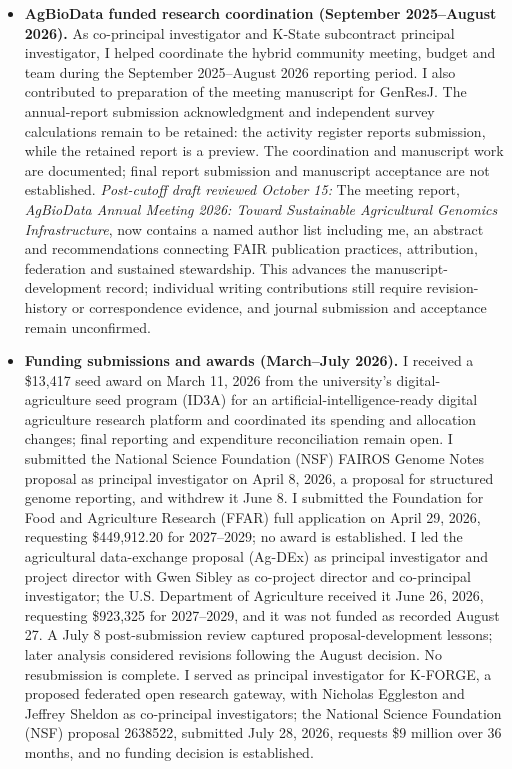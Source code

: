 \begin{itemize}
\item \textbf{AgBioData funded research coordination (September 2025--August 2026).}\label{update-agbiodata} As co-principal investigator and K-State subcontract principal investigator, I helped coordinate the hybrid community meeting, budget and team during the September 2025--August 2026 reporting period. I also contributed to preparation of the meeting manuscript for GenResJ. The annual-report submission acknowledgment and independent survey calculations remain to be retained: the activity register reports submission, while the retained report is a preview. The coordination and manuscript work are documented; final report submission and manuscript acceptance are not established. \textit{Post-cutoff draft reviewed October 15:} The meeting report, \textit{AgBioData Annual Meeting 2026: Toward Sustainable Agricultural Genomics Infrastructure}, now contains a named author list including me, an abstract and recommendations connecting FAIR publication practices, attribution, federation and sustained stewardship. This advances the manuscript-development record; individual writing contributions still require revision-history or correspondence evidence, and journal submission and acceptance remain unconfirmed.
\item \textbf{Funding submissions and awards (March--July 2026).} I received a \$13,417 seed award on March 11, 2026 from the university's digital-agriculture seed program (ID3A) for an artificial-intelligence-ready digital agriculture research platform and coordinated its spending and allocation changes; final reporting and expenditure reconciliation remain open. I submitted the National Science Foundation (NSF) FAIROS Genome Notes proposal as principal investigator on April 8, 2026, a proposal for structured genome reporting, and withdrew it June 8. I submitted the Foundation for Food and Agriculture Research (FFAR) full application on April 29, 2026, requesting \$449,912.20 for 2027--2029; no award is established. I led the agricultural data-exchange proposal (Ag-DEx) as principal investigator and project director with Gwen Sibley as co-project director and co-principal investigator; the U.S. Department of Agriculture received it June 26, 2026, requesting \$923,325 for 2027--2029, and it was not funded as recorded August 27. A July 8 post-submission review captured proposal-development lessons; later analysis considered revisions following the August decision. No resubmission is complete. I served as principal investigator for K-FORGE, a proposed federated open research gateway, with Nicholas Eggleston and Jeffrey Sheldon as co-principal investigators; the National Science Foundation (NSF) proposal 2638522, submitted July 28, 2026, requests \$9 million over 36 months, and no funding decision is established.

\end{itemize}
